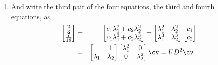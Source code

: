 \begin{example}
\begin{solution}
\begin{enumerate}
\begin{enumerate}
\item And write the third pair of the four equations, the third and fourth equations, as
\begin{eqnarray*}
\begin{bmatrix} \frac23\\\frac7{18} \end{bmatrix}
&=&\begin{bmatrix} c_1\lambda_1^2+c_2\lambda_2^2\\ c_1\lambda_1^3+c_2\lambda_2^3\end{bmatrix}
=\begin{bmatrix} \lambda_1^2&\lambda_2^2\\\lambda_1^3&\lambda_2^3 \end{bmatrix}\begin{bmatrix} c_1\\c_2 \end{bmatrix}
\\&=&\begin{bmatrix} 1&1\\\lambda_1&\lambda_2 \end{bmatrix}
\begin{bmatrix} \lambda_1^2&0\\0&\lambda_2^2 \end{bmatrix}\cv
=UD^2\cv\,.
\end{eqnarray*}
\end{enumerate}


\end{enumerate}
\end{solution}
\end{example}
